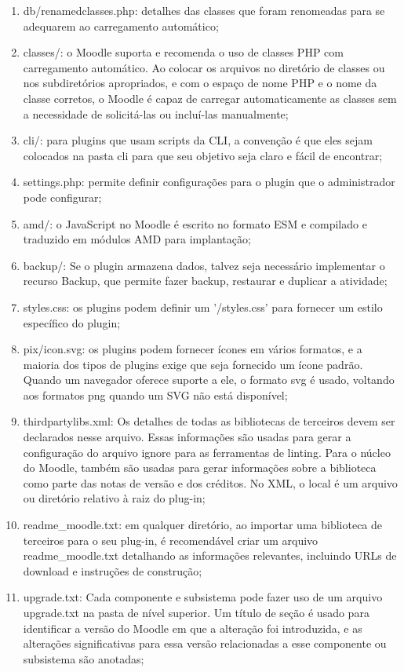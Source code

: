 \begin{enumerate} [label=(\alph*)]
    \item db/renamedclasses.php: detalhes das classes que foram renomeadas para se adequarem ao carregamento automático;
    \item classes/: o Moodle suporta e recomenda o uso de classes PHP com carregamento automático. Ao colocar os arquivos no diretório de classes ou nos subdiretórios apropriados, e com o espaço de nome PHP e o nome da classe corretos, o Moodle é capaz de carregar automaticamente as classes sem a necessidade de solicitá-las ou incluí-las manualmente;
    \item cli/: para plugins que usam scripts da CLI, a convenção é que eles sejam colocados na pasta cli para que seu objetivo seja claro e fácil de encontrar;
    \item settings.php: permite definir configurações para o plugin que o administrador pode configurar;
    \item amd/: o JavaScript no Moodle é escrito no formato ESM e compilado e traduzido em módulos AMD para implantação;
    \item backup/: Se o plugin armazena dados, talvez seja necessário implementar o recurso Backup, que permite fazer backup, restaurar e duplicar a atividade;
    \item styles.css: os plugins podem definir um '/styles.css' para fornecer um estilo específico do plugin;
    \item pix/icon.svg: os plugins podem fornecer ícones em vários formatos, e a maioria dos tipos de plugins exige que seja fornecido um ícone padrão. Quando um navegador oferece suporte a ele, o formato svg é usado, voltando aos formatos png quando um SVG não está disponível;
    \item thirdpartylibs.xml: Os detalhes de todas as bibliotecas de terceiros devem ser declarados nesse arquivo. Essas informações são usadas para gerar a configuração do arquivo ignore para as ferramentas de linting. Para o núcleo do Moodle, também são usadas para gerar informações sobre a biblioteca como parte das notas de versão e dos créditos. No XML, o local é um arquivo ou diretório relativo à raiz do plug-in;
    \item readme\_moodle.txt: em qualquer diretório, ao importar uma biblioteca de terceiros para o seu plug-in, é recomendável criar um arquivo readme\_moodle.txt detalhando as informações relevantes, incluindo URLs de download e instruções de construção;
    \item upgrade.txt: Cada componente e subsistema pode fazer uso de um arquivo upgrade.txt na pasta de nível superior. Um título de seção é usado para identificar a versão do Moodle em que a alteração foi introduzida, e as alterações significativas para essa versão relacionadas a esse componente ou subsistema são anotadas;

\end{enumerate}
